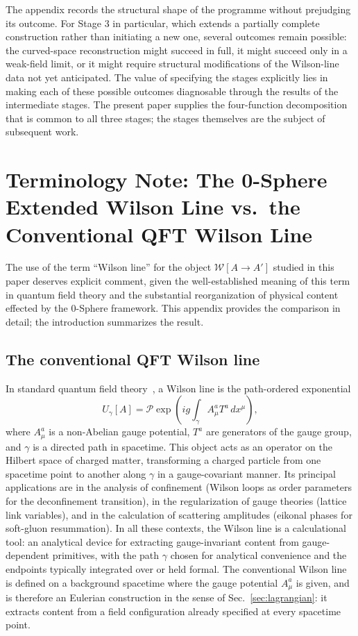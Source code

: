 \documentclass[%
 reprint, amsmath,amssymb, aps, prb, ]{revtex4-2}
\numberwithin{equation}{section}
\newcommand{\WL}{\mathcal{W}}
\begin{document}
The appendix records the structural shape of the programme without prejudging its outcome. For Stage 3 in particular, which extends a partially complete construction rather than initiating a new one, several outcomes remain possible: the curved-space reconstruction might succeed in full, it might succeed only in a weak-field limit, or it might require structural modifications of the Wilson-line data not yet anticipated. The value of specifying the stages explicitly lies in making each of these possible outcomes diagnosable through the results of the intermediate stages. The present paper supplies the four-function decomposition that is common to all three stages; the stages themselves are the subject of subsequent work.

\section{Terminology Note: The 0-Sphere Extended Wilson Line vs.\ the Conventional QFT Wilson Line}
\label{app:terminology}

The use of the term ``Wilson line'' for the object $\WL[A\to A']$ studied in this paper deserves explicit comment, given the well-established meaning of this term in quantum field theory and the substantial reorganization of physical content effected by the 0-Sphere framework. This appendix provides the comparison in detail; the introduction summarizes the result.

\subsection{The conventional QFT Wilson line}

In standard quantum field theory~\cite{Wilson1974}, a Wilson line is the path-ordered exponential
\begin{equation}
U_\gamma[A] = \mathcal{P}\exp\!\left(ig\int_\gamma A_\mu^a T^a\,dx^\mu\right),
\label{eq:WL_QFT}
\end{equation}
where $A_\mu^a$ is a non-Abelian gauge potential, $T^a$ are generators of the gauge group, and $\gamma$ is a directed path in spacetime. This object acts as an operator on the Hilbert space of charged matter, transforming a charged particle from one spacetime point to another along $\gamma$ in a gauge-covariant manner. Its principal applications are in the analysis of confinement (Wilson loops as order parameters for the deconfinement transition), in the regularization of gauge theories (lattice link variables), and in the calculation of scattering amplitudes (eikonal phases for soft-gluon resummation). In all these contexts, the Wilson line is a calculational tool: an analytical device for extracting gauge-invariant content from gauge-dependent primitives, with the path $\gamma$ chosen for analytical convenience and the endpoints typically integrated over or held formal. The conventional Wilson line is defined on a background spacetime where the gauge potential $A_\mu^a$ is given, and is therefore an Eulerian construction in the sense of Sec.~\ref{sec:lagrangian}: it extracts content from a field configuration already specified at every spacetime point.
\end{document}
